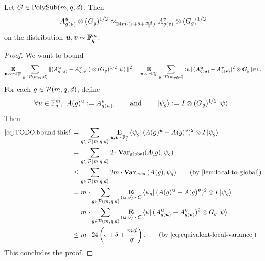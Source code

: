 \begin{lemma}\label{lem:global-variance-of-points}
Let $G \in \mathrm{PolySub}(m, q, d)$.  Then
\begin{equation}\label{eq:global-variance-of-points-equation}
A^u_{g(u)} \otimes (G_g)^{1/2} \approx_{24m\cdot(\epsilon + \delta + \frac{md}{q})} A^v_{g(v)} \otimes (G_g)^{1/2}
\end{equation}
on the distribution $\boldsymbol{u}, \boldsymbol{v} \sim \mathbb F_q^m$.
\end{lemma}
\begin{proof}
We want to bound 
\begin{equation}\label{eq:TODO:bound-this!}
\mathop{\bf E\/}_{\boldsymbol{u}, \boldsymbol{v} \sim \mathbb F_q^m} \sum_{g \in \mathcal{P}(m, q, d)} \Vert (A^{\boldsymbol{u}}_{g(\boldsymbol{u})}  - A^{\boldsymbol{v}}_{g(\boldsymbol{v})} ) \otimes (G_g)^{1/2} \ket{\psi}\Vert^2
= \mathop{\bf E\/}_{\boldsymbol{u}, \boldsymbol{v} \sim \mathbb F_q^m} \sum_{g \in \mathcal{P}(m, q, d)} \bra{\psi} (A^{\boldsymbol{u}}_{g(\boldsymbol{u})}  - A^{\boldsymbol{v}}_{g(\boldsymbol{v})} )^2 \otimes G_g \ket{\psi}.
\end{equation}
For each $g \in \mathcal{P}(m, q, d)$, define
\begin{equation*}
\forall u \in \mathbb F_q^m, ~ A(g)^u := A^u_{g(u)}, \qquad \text{and} \qquad \ket{\psi_g} := I \otimes (G_g)^{1/2} \ket{\psi}.
\end{equation*}
Then
\begin{align*}
\eqref{eq:TODO:bound-this!}
& = \sum_{g \in \polyfunc{m}{q}{d}}\E_{\bu, \bv \sim \F_q^n} \bra{\psi_g} (A(g)^{\bu}  - A(g)^{\bv})^2 \otimes I \ket{\psi_g}\\
& = \sum_{g \in \polyfunc{m}{q}{d}}2\cdot  \mathbf{Var}_{\mathrm{global}}(A(g), \psi_g)\\
& \leq \sum_{g \in \polyfunc{m}{q}{d}}2m\cdot \mathbf{Var}_{\mathrm{local}}(A(g), \psi_g)\tag{by \Cref{lem:local-to-global}}\\
& = m \cdot \sum_{g \in \polyfunc{m}{q}{d}}\E_{(\bu, \bv) \sim C} \bra{\psi_g} (A(g)^{\bu}  - A(g)^{\bv})^2 \otimes I \ket{\psi_g}\\
& = m \cdot \sum_{g \in \polyfunc{m}{q}{d}}\E_{(\bu, \bv) \sim C} \bra{\psi} (A^{\bu}_{g(\bu)}  - A^{\bv}_{g(\bv)})^2 \otimes G_g \ket{\psi}\\
& \leq m \cdot 24\left(\eps + \delta + \frac{md}{q}\right).\tag{by \Cref{eq:equivalent-local-variance}}
\end{align*}
This concludes the proof.
\end{proof}
